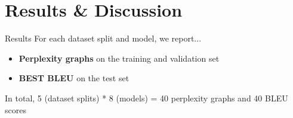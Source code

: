 \documentclass[11pt]{beamer}
\begin{document}
\section{Results \& Discussion}

\begin{frame}{Results}
    For each dataset split and model, we report...
    \begin{itemize}
        \item \textbf{Perplexity graphs} on the training and validation set
        \item \textbf{BEST BLEU} on the test set
    \end{itemize}
    \medskip\medskip
    In total, 5 (dataset splits) * 8 (models) = 40 perplexity graphs and 40 BLEU scores
\end{frame}
\end{document}
